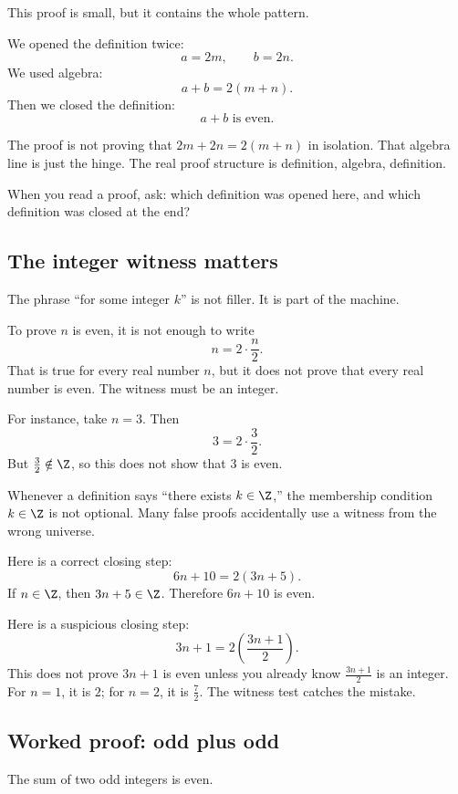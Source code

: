 This proof is small, but it contains the whole pattern.

We opened the definition twice:
\[
a=2m,\qquad b=2n.
\]
We used algebra:
\[
a+b=2(m+n).
\]
Then we closed the definition:
\[
a+b\text{ is even}.
\]

The proof is not proving that $2m+2n=2(m+n)$ in isolation. That algebra line is just the hinge. The real proof structure is definition, algebra, definition.

\begin{walkbox}
When you read a proof, ask: which definition was opened here, and which definition was closed at the end?
\end{walkbox}

\subsection{The integer witness matters}

The phrase ``for some integer $k$'' is not filler. It is part of the machine.

To prove $n$ is even, it is not enough to write
\[
n=2\cdot\frac n2.
\]
That is true for every real number $n$, but it does not prove that every real number is even. The witness must be an integer.

For instance, take $n=3$. Then
\[
3=2\cdot\frac32.
\]
But $\frac32\notin\Z$, so this does not show that $3$ is even.

\begin{trapbox}
Whenever a definition says ``there exists $k\in\Z$,'' the membership condition $k\in\Z$ is not optional. Many false proofs accidentally use a witness from the wrong universe.
\end{trapbox}

Here is a correct closing step:
\[
6n+10=2(3n+5).
\]
If $n\in\Z$, then $3n+5\in\Z$. Therefore $6n+10$ is even.

Here is a suspicious closing step:
\[
3n+1=2\left(\frac{3n+1}{2}\right).
\]
This does not prove $3n+1$ is even unless you already know $\frac{3n+1}{2}$ is an integer. For $n=1$, it is $2$; for $n=2$, it is $\frac72$. The witness test catches the mistake.

\subsection{Worked proof: odd plus odd}

\begin{theorem}
The sum of two odd integers is even.
\end{theorem}

